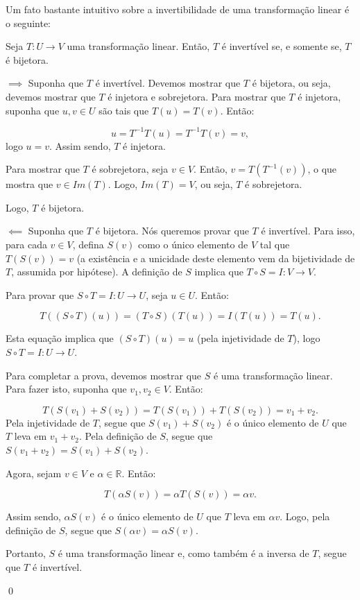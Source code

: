 Um fato bastante intuitivo sobre a invertibilidade de uma transformação linear é o seguinte:

\begin{Theorem}
	Seja $T:U\to V$ uma transformação linear. Então, $T$ é invertível se, e somente se, $T$ é bijetora.
\end{Theorem}

\begin{Proof}
	$\implies$ Suponha que $T$ é invertível. Devemos mostrar que $T$ é bijetora, ou seja, devemos mostrar que $T$ é injetora e sobrejetora. Para mostrar que $T$ é injetora, suponha que $u, v\in U$ são tais que $T(u) = T(v)$. Então:
	
	$$
	u = T^{-1}T(u) = T^{-1}T(v) = v,
	$$
	logo $u = v$. Assim sendo, $T$ é injetora.
	
	Para mostrar que $T$ é sobrejetora, seja $v\in V$. Então, $v = T(T^{-1}(v))$, o que mostra que $v\in Im(T)$. Logo, $Im(T) = V$, ou seja, $T$ é sobrejetora.
	
	Logo, $T$ é bijetora.
	
	$\impliedby$ Suponha que $T$ é bijetora. Nós queremos provar que $T$ é invertível. Para isso, para cada $v\in V$, defina $S(v)$ como o único elemento de $V$ tal que $T(S(v)) = v$ (a existência e a unicidade deste elemento vem da bijetividade de $T$, assumida por hipótese). A definição de $S$ implica que $T\circ S = I:V\to V$.
	
	Para provar que $S\circ T = I:U\to U$, seja $u\in U$. Então:
	
	$$
	T((S\circ T)(u)) = (T\circ S)(T(u)) = I(T(u)) = T(u).
	$$
	
	Esta equação implica que $(S\circ T)(u) = u$ (pela injetividade de $T$), logo $S\circ T = I:U\to U$.
	
	Para completar a prova, devemos mostrar que $S$ é uma transformação linear. Para fazer isto, suponha que $v_1, v_2\in V$. Então:
	
	$$
	T(S(v_1) + S(v_2)) = T(S(v_1)) + T(S(v_2)) = v_1 + v_2.
	$$
	Pela injetividade de $T$, segue que $S(v_1) + S(v_2)$ é o único elemento de $U$ que $T$ leva em $v_1 + v_2$. Pela definição de $S$, segue que $S(v_1 + v_2) = S(v_1) + S(v_2)$.
	
	Agora, sejam $v\in V$ e $\alpha\in\mathbb{R}$. Então:
	
	$$
	T(\alpha S(v)) = \alpha T(S(v)) = \alpha v.
	$$
	
	Assim sendo, $\alpha S(v)$ é o único elemento de $U$ que $T$ leva em $\alpha v$. Logo, pela definição de $S$, segue que $S(\alpha v) = \alpha S(v)$.
	
	Portanto, $S$ é uma transformação linear e, como também é a inversa de $T$, segue que $T$ é invertível.
	
	\qed
\end{Proof}

